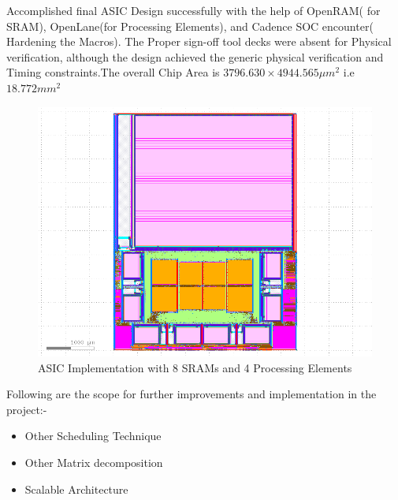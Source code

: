 Accomplished final ASIC Design successfully with the help of OpenRAM( for SRAM), OpenLane(for Processing Elements), and Cadence SOC encounter( Hardening the Macros). The Proper sign-off tool decks were absent for Physical verification, although the design achieved the generic physical verification and Timing constraints.The overall Chip Area is $3796.630 \times 4944.565  \mu m^2$ i.e $ 18.772 mm^2 $

\begin{figure}[H]
    \centering
    \includegraphics[width = \textwidth]{./Software/Final.png}
    \caption{ASIC Implementation with 8 SRAMs and 4 Processing Elements}
\end{figure}


Following are the scope for further improvements and implementation in the project:-
\begin{itemize}
	\item Other Scheduling Technique
	\item Other Matrix decomposition
    \item Scalable Architecture
\end{itemize}
